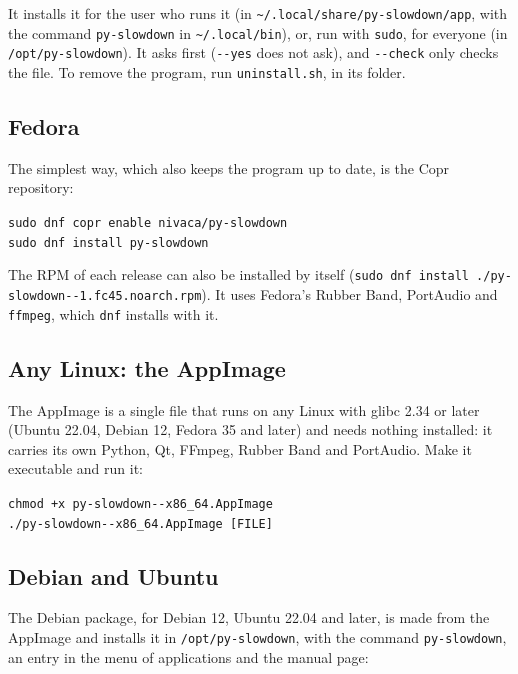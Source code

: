 \documentclass[12pt,
              article,
              oneside
              ]{memoir}
\renewenvironment{quote}%
 {\begin{list}{}%
              {\setlength\rightmargin{0pt}%
              \setlength\leftmargin{\parindent}}%
  \item[]\small\ignorespaces}
 {\unskip\end{list}}
\begin{document}
\noindent It installs it for the user who runs it (in
\texttt{\textasciitilde/.local/share/py-slowdown/app}, with the command
\texttt{py-slowdown} in \texttt{\textasciitilde/.local/bin}), or, run with
\texttt{sudo}, for everyone (in \texttt{/opt/py-slowdown}). It asks first
(\texttt{-{}-yes} does not ask), and \texttt{-{}-check} only checks the
file. To remove the program, run \texttt{uninstall.sh}, in its folder.

\subsection{Fedora}

%
The simplest way, which also keeps the program up to date, is the Copr
repository:

\begin{quote}
\texttt{sudo dnf copr enable nivaca/py-slowdown}\\
\texttt{sudo dnf install py-slowdown}
\end{quote}

\noindent The RPM of each release can also be installed by itself
(\texttt{sudo dnf install ./py-slowdown-\version-1.fc45.noarch.rpm}). It
uses Fedora's Rubber Band, PortAudio and \texttt{ffmpeg}, which
\texttt{dnf} installs with it.

\subsection{Any Linux: the AppImage}

%
The AppImage is a single file that runs on any Linux with glibc 2.34 or
later (Ubuntu 22.04, Debian 12, Fedora 35 and later) and needs nothing
installed: it carries its own Python, Qt, FFmpeg, Rubber Band and
PortAudio. Make it executable and run it:

\begin{quote}
\texttt{chmod +x py-slowdown-\version-x86\_64.AppImage}\\
\texttt{./py-slowdown-\version-x86\_64.AppImage [FILE]}
\end{quote}

\subsection{Debian and Ubuntu}

%
The Debian package, for Debian 12, Ubuntu 22.04 and later, is made from the
AppImage and installs it in \texttt{/opt/py-slowdown}, with the command
\texttt{py-slowdown}, an entry in the menu of applications and the manual
page:
\end{document}
